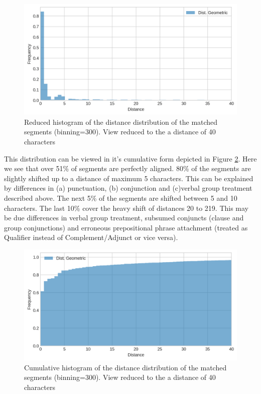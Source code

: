 \begin{figure}[!ht]
    \centering
    \includegraphics[width=.65\textwidth]{evaluation-results/figures/distance-distr-histogram}
    \caption{Reduced histogram of the distance distribution of the matched segments (binning=300). View reduced to the a distance of 40 characters}
    \label{fig:segment-distance-histogram}
\end{figure}

This distribution can be viewed in it's cumulative form depicted in Figure \ref{fig:segment-distance-distribution}. Here we see that over 51\% of segments are perfectly aligned. 80\% of the segments are slightly shifted up to a distance of maximum 5 characters. This can be explained by differences in (a) punctuation, (b) conjunction and (c)verbal group treatment described above. The next 5\% of the segments are shifted between 5 and 10 characters. The last 10\% cover the heavy shift of distances 20 to 219. This may be due differences in verbal group treatment, subsumed conjuncts (clause and group conjunctions) and erroneous prepositional phrase attachment (treated as Qualifier instead of Complement/Adjunct or vice versa). 

\begin{figure}[!ht]
    \centering
    \includegraphics[width=.65\textwidth]{evaluation-results/figures/distance-distr-cumulative}
    \caption{Cumulative histogram of the distance distribution of the matched segments (binning=300). View reduced to the a distance of 40 characters}
    \label{fig:segment-distance-distribution}
\end{figure}

